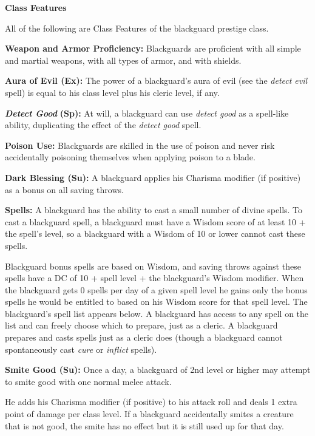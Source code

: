 \documentclass{article}
\begin{document}
\vspace{12pt}
\textbf{Class Features}

All of the following are Class Features of the blackguard prestige class.

\textbf{Weapon and Armor Proficiency:} Blackguards are proficient with all simple 
and martial weapons, with all types of armor, and with shields.

\textbf{Aura of Evil (Ex):} The power of a blackguard's aura of evil (see the \textit{detect 
evil }spell) is equal to his class level plus his cleric level, if any.

\textit{\textbf{Detect Good }}\textbf{(Sp):} At will, a blackguard can use \textit{detect 
good }as a spell-like ability, duplicating the effect of the \textit{detect good 
}spell.

\textbf{Poison Use:} Blackguards are skilled in the use of poison and never risk 
accidentally poisoning themselves when applying poison to a blade.

\textbf{Dark Blessing (Su):} A blackguard applies his Charisma modifier (if positive) 
as a bonus on all saving throws.

\textbf{Spells:} A blackguard has the ability to cast a small number of divine 
spells. To cast a blackguard spell, a blackguard must have a Wisdom score of at 
least 10 + the spell's level, so a blackguard with a Wisdom of 10 or lower cannot 
cast these spells.

Blackguard bonus spells are based on Wisdom, and saving throws against these spells 
have a DC of 10 + spell level + the blackguard's Wisdom modifier. When the blackguard 
gets 0 spells per day of a given spell level he gains only the bonus spells he 
would be entitled to based on his Wisdom score for that spell level. The blackguard's 
spell list appears below. A blackguard has access to any spell on the list and 
can freely choose which to prepare, just as a cleric. A blackguard prepares and 
casts spells just as a cleric does (though a blackguard cannot spontaneously cast 
\textit{cure }or \textit{inflict }spells).

\textbf{Smite Good (Su):} Once a day, a blackguard of 2nd level or higher may attempt 
to smite good with one normal melee attack.

He adds his Charisma modifier (if positive) to his attack roll and deals 1 extra 
point of damage per class level. If a blackguard accidentally smites a creature 
that is not good, the smite has no effect but it is still used up for that day.
\end{document}
